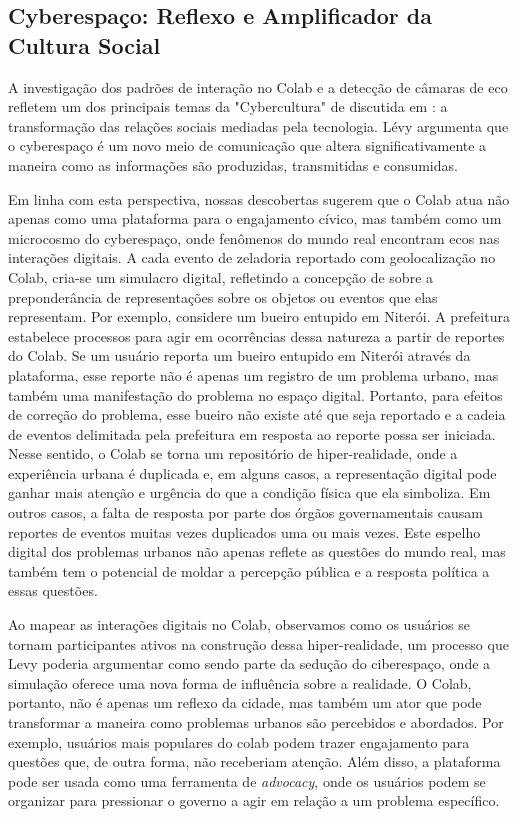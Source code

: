 \subsection*{Cyberespaço: Reflexo e Amplificador da Cultura Social}

A investigação dos padrões de interação no Colab e a detecção de câmaras de eco refletem um dos principais temas da "Cybercultura" de discutida em : a transformação das relações sociais mediadas pela tecnologia. Lévy argumenta que o cyberespaço é um novo meio de comunicação que altera significativamente a maneira como as informações são produzidas, transmitidas e consumidas.

Em linha com esta perspectiva, nossas descobertas sugerem que o Colab atua não apenas como uma plataforma para o engajamento cívico, mas também como um microcosmo do cyberespaço, onde fenômenos do mundo real encontram ecos nas interações digitais. A cada evento de zeladoria reportado com geolocalização no Colab, cria-se um simulacro digital, refletindo a concepção de  sobre a preponderância de representações sobre os objetos ou eventos que elas representam. Por exemplo, considere um bueiro entupido em Niterói. A prefeitura estabelece processos para agir em ocorrências dessa natureza a partir de reportes do Colab. Se um usuário reporta um bueiro entupido em Niterói através da plataforma, esse reporte não é apenas um registro de um problema urbano, mas também uma manifestação do problema no espaço digital. Portanto, para efeitos de correção do problema, esse bueiro não existe até que seja reportado e a cadeia de eventos delimitada pela prefeitura em resposta ao reporte possa ser iniciada. Nesse sentido, o Colab se torna um repositório de hiper-realidade, onde a experiência urbana é duplicada e, em alguns casos, a representação digital pode ganhar mais atenção e urgência do que a condição física que ela simboliza. Em outros casos, a falta de resposta por parte dos órgãos governamentais causam reportes de eventos muitas vezes duplicados uma ou mais vezes. Este espelho digital dos problemas urbanos não apenas reflete as questões do mundo real, mas também tem o potencial de moldar a percepção pública e a resposta política a essas questões.

Ao mapear as interações digitais no Colab, observamos como os usuários se tornam participantes ativos na construção dessa hiper-realidade, um processo que Levy poderia argumentar como sendo parte da sedução do ciberespaço, onde a simulação oferece uma nova forma de influência sobre a realidade. O Colab, portanto, não é apenas um reflexo da cidade, mas também um ator que pode transformar a maneira como problemas urbanos são percebidos e abordados. Por exemplo, usuários mais populares do colab podem trazer engajamento para questões que, de outra forma, não receberiam atenção. Além disso, a plataforma pode ser usada como uma ferramenta de \textit{advocacy}, onde os usuários podem se organizar para pressionar o governo a agir em relação a um problema específico.

